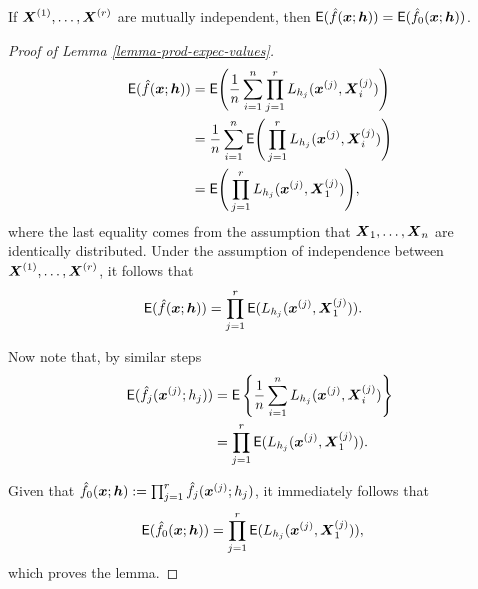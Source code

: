 \documentclass[oneside,11pt]{article}
\begin{document}
\begin{lemma}\label{lemma-prod-expec-values}
    If $\boldsymbol{X}^{(1)}, \dots, \boldsymbol{X}^{(r)}$ are mutually independent, then $\mathsf{E} (\hat{f}(\boldsymbol{x};{\boldsymbol{h}})) = \mathsf{E} (\hat{f}_{0}(\boldsymbol{x};{\boldsymbol{h}}))$.
\end{lemma}
\begin{proof}[Proof of Lemma \ref{lemma-prod-expec-values}]
    \begin{align*}
        \mathsf{E} (\hat{f}(\boldsymbol{x};{\boldsymbol{h}})) &= \mathsf{E} \Bigg( \frac{1}{n} \sum_{i=1}^{n} \prod_{j=1}^{r} L_{h_j} (\boldsymbol{x}^{(j)},\boldsymbol{X}_i^{(j)}) \Bigg) \\
        &= \frac{1}{n} \sum_{i=1}^{n} \mathsf{E} \Bigg( \prod_{j=1}^{r} L_{h_j} (\boldsymbol{x}^{(j)},\boldsymbol{X}_i^{(j)}) \Bigg) \\
        &= \mathsf{E} \Bigg( \prod_{j=1}^{r} L_{h_j} (\boldsymbol{x}^{(j)},\boldsymbol{X}_1^{(j)}) \Bigg),
    \end{align*}
    where the last equality comes from the assumption that $\boldsymbol{X}_1, \dots, \boldsymbol{X}_n$ are identically distributed. Under the assumption of independence between $\boldsymbol{X}^{(1)}, \dots, \boldsymbol{X}^{(r)}$, it follows that
    \begin{align*}
        \mathsf{E} (\hat{f}(\boldsymbol{x};{\boldsymbol{h}})) &= \prod_{j=1}^{r} \mathsf{E} ( L_{h_j} (\boldsymbol{x}^{(j)},\boldsymbol{X}_1^{(j)}) ).
    \end{align*}

    Now note that, by similar steps
    \begin{align*}
        \mathsf{E} (\hat{f}_{j}(\boldsymbol{x}^{(j)};h_j)) &= \mathsf{E} \left\{\frac{1}{n} \sum_{i=1}^{n} L_{h_j} (\boldsymbol{x}^{(j)},\boldsymbol{X}_i^{(j)})\right\} \\
        &= \prod_{j=1}^{r} \mathsf{E} ( L_{h_j} (\boldsymbol{x}^{(j)},\boldsymbol{X}_1^{(j)}) ).
    \end{align*}

    Given that $\hat{f}_{0}(\boldsymbol{x};{\boldsymbol{h}}) := \prod_{j=1}^{r} \hat{f}_{j}(\boldsymbol{x}^{(j)};h_j)$, it immediately follows that
    \begin{align*}
        \mathsf{E} (\hat{f}_{0}(\boldsymbol{x};{\boldsymbol{h}})) &= \prod_{j=1}^{r} \mathsf{E} ( L_{h_j} (\boldsymbol{x}^{(j)},\boldsymbol{X}_1^{(j)}) ),
    \end{align*}
    which proves the lemma.
    
\end{proof}
\end{document}
